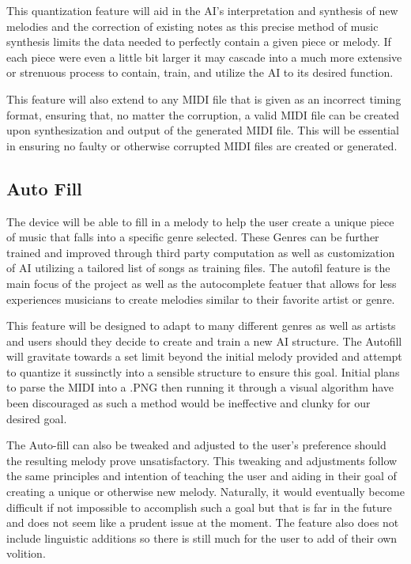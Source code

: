 This quantization feature will aid in the AI's interpretation and synthesis of new
melodies and the correction of existing notes as this precise method of music synthesis
limits the data needed to perfectly contain a given piece or melody. If each piece were
even a little bit larger it may cascade into a much more extensive or strenuous process to
contain, train, and utilize the AI to its desired function. 

This feature will also extend to any MIDI file that is given as an incorrect timing
format, ensuring that, no matter the corruption, a valid MIDI file can be created upon
synthesization and output of the generated MIDI file. This will be essential in ensuring
no faulty or otherwise corrupted MIDI files are created or generated.

\subsection{Auto Fill}

The device will be able to fill in a melody to help the user create a unique piece of
music that falls into a specific genre selected. These Genres can be further trained and
improved through third party computation as well as customization of AI utilizing a
tailored list of songs as training files. The autofil feature is the main focus of the
project as well as the autocomplete featuer that allows for less experiences musicians to
create melodies similar to their favorite artist or genre. 

This feature will be designed to adapt to many different genres as well as artists and
users should they decide to create and train a new AI structure. The Autofill will
gravitate towards a set limit beyond the initial melody provided and attempt to quantize
it sussinctly into a sensible structure to ensure this goal. Initial plans to parse the
MIDI into a .PNG then running it through a visual algorithm have been discouraged as such
a method would be ineffective and clunky for our desired goal.

The Auto-fill can also be tweaked and adjusted to the user's preference should the
resulting melody prove unsatisfactory. This tweaking and adjustments follow the same
principles and intention of teaching the user and aiding in their goal of creating a
unique or otherwise new melody. Naturally, it would eventually become difficult if not
impossible to accomplish such a goal but that is far in the future and does not seem like
a prudent issue at the moment. The feature also does not include linguistic additions so
there is still much for the user to add of their own volition. 

